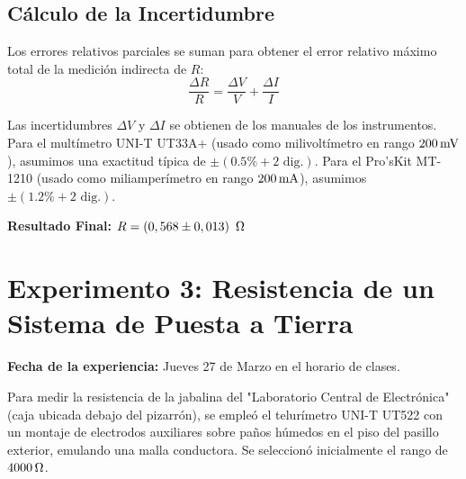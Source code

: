 \subsection{Cálculo de la Incertidumbre}
Los errores relativos parciales se suman para obtener el error relativo máximo total de la medición indirecta de $R$:
\begin{equation}
    \frac{\Delta R}{R} = \frac{\Delta V}{V} + \frac{\Delta I}{I}
\end{equation}

Las incertidumbres $\Delta V$ y $\Delta I$ se obtienen de los manuales de los instrumentos. Para el multímetro UNI-T UT33A+ (usado como milivoltímetro en rango $200\mV$), asumimos una exactitud típica de $\pm(0.5\% + 2 \text{ dig.})$. Para el Pro'sKit MT-1210 (usado como miliamperímetro en rango $200\mA$), asumimos $\pm(1.2\% + 2 \text{ dig.})$.

\begin{table}[H]
    \centering
    \caption{Desglose de valores de incertidumbre.}
\end{table}

\textbf{Resultado Final:} $R = (0,568 \pm 0,013) \ \ohm$

\section{Experimento 3: Resistencia de un Sistema de Puesta a Tierra}
\textbf{Fecha de la experiencia:} Jueves 27 de Marzo en el horario de clases.

Para medir la resistencia de la jabalina del "Laboratorio Central de Electrónica" (caja ubicada debajo del pizarrón), se empleó el telurímetro UNI-T UT522 con un montaje de electrodos auxiliares sobre paños húmedos en el piso del pasillo exterior, emulando una malla conductora. Se seleccionó inicialmente el rango de $4000\ohm$.

